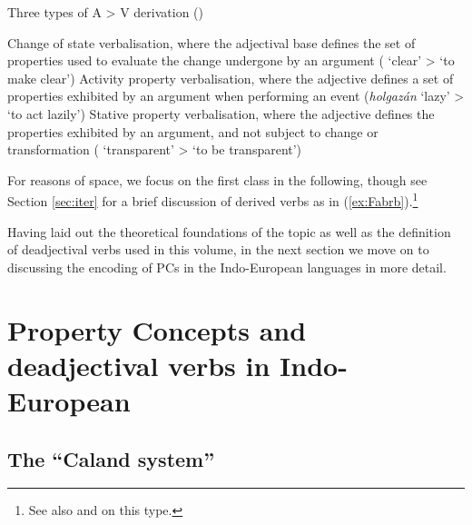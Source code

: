 \documentclass[output=paper,colorlinks,citecolor=brown]{langscibook}
\begin{document}
\begin{exe}
    \ex \label{ex:Fabregascl} Three types of A > V derivation (\citealt[63]{Fabregas2023})
\begin{xlist}
    \ex Change of state verbalisation, where the adjectival base defines the set of properties used to evaluate the change undergone by an argument ( `clear' >  `to make clear')
\ex Activity property verbalisation, where the adjective defines a set of properties exhibited by an argument when performing an event (\mbox{\textit{holgazán}} `lazy' >  `to act lazily') \label{ex:Fabrb}
\ex Stative property verbalisation, where the adjective defines the properties exhibited by an argument, and not subject to change or transformation ( `transparent' >  ‘to be transparent’)
\end{xlist} 
\end{exe}

For reasons of space, we focus on the first class in the following, though see Section \ref{sec:iter} for a brief discussion of derived  verbs as in (\ref{ex:Fabrb}).\footnote{See also \citealt{OltraCastroviejo2014} and \citealt{AcedoGibert2022} on this type.}


Having laid out the theoretical foundations of the topic as well as the definition of deadjectival verbs used in this volume, in the next section we move on to discussing the encoding of PCs in the Indo-European languages in more detail.

\section{Property Concepts and deadjectival verbs in Indo-European}
\label{sec:CSIE}


\subsection{The ``Caland system''}
\label{sec:Calanddef}
\end{document}
